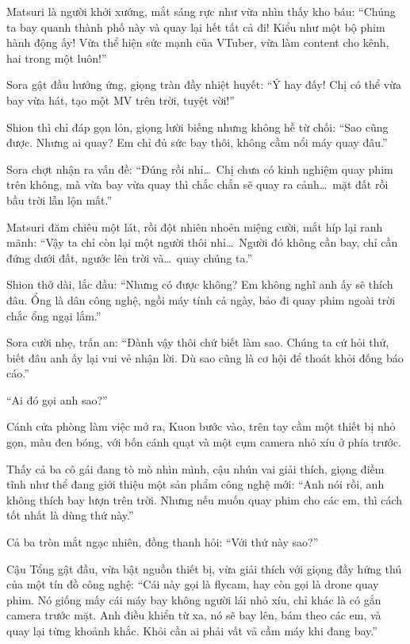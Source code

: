 \documentclass[../main.tex]{subfiles}
\begin{document}
Matsuri là người khởi xướng, mắt sáng rực như vừa nhìn thấy kho báu: ``Chúng ta bay quanh thành phố này và quay lại hết tất cả đi! Kiểu như một bộ phim hành động ấy! Vừa thể hiện sức mạnh của VTuber, vừa làm content cho kênh, hai trong một luôn!''

Sora gật đầu hưởng ứng, giọng tràn đầy nhiệt huyết: ``Ý hay đấy! Chị có thể vừa bay vừa hát, tạo một MV trên trời, tuyệt vời!''

Shion thì chỉ đáp gọn lỏn, giọng lười biếng nhưng không hề từ chối: ``Sao cũng được. Nhưng ai quay? Em chỉ đủ sức bay thôi, không cầm nổi máy quay đâu.''

Sora chợt nhận ra vấn đề: ``Đúng rồi nhỉ\dots\ Chị chưa có kinh nghiệm quay phim trên không, mà vừa bay vừa quay thì chắc chắn sẽ quay ra cảnh\dots\ mặt đất rồi bầu trời lẫn lộn mất.''

Matsuri đăm chiêu một lát, rồi đột nhiên nhoẻn miệng cười, mắt híp lại ranh mãnh: ``Vậy ta chỉ còn lại một người thôi nhỉ\dots\ Người đó không cần bay, chỉ cần đứng dưới đất, ngước lên trời và\dots\ quay chúng ta.''

Shion thở dài, lắc đầu: ``Nhưng có được không? Em không nghĩ anh ấy sẽ thích đâu. Ổng là dân công nghệ, ngồi máy tính cả ngày, bảo đi quay phim ngoài trời chắc ổng ngại lắm.''

Sora cười nhẹ, trấn an: ``Đành vậy thôi chứ biết làm sao. Chúng ta cứ hỏi thử, biết đâu anh ấy lại vui vẻ nhận lời. Dù sao cũng là cơ hội để thoát khỏi đống báo cáo.''

``Ai đó gọi anh sao?''

Cánh cửa phòng làm việc mở ra, Kuon bước vào, trên tay cầm một thiết bị nhỏ gọn, màu đen bóng, với bốn cánh quạt và một cụm camera nhỏ xíu ở phía trước.

Thấy cả ba cô gái đang tò mò nhìn mình, cậu nhún vai giải thích, giọng điềm tĩnh như thể đang giới thiệu một sản phẩm công nghệ mới: ``Anh nói rồi, anh không thích bay lượn trên trời. Nhưng nếu muốn quay phim cho các em, thì cách tốt nhất là dùng thứ này.''

Cả ba tròn mắt ngạc nhiên, đồng thanh hỏi: ``Với thứ này sao?''

Cậu Tổng gật đầu, vừa bật nguồn thiết bị, vừa giải thích với giọng đầy hứng thú của một tín đồ công nghệ: ``Cái này gọi là flycam, hay còn gọi là drone quay phim. Nó giống mấy cái máy bay không người lái nhỏ xíu, chỉ khác là có gắn camera trước mặt. Anh điều khiển từ xa, nó sẽ bay lên, bám theo các em, và quay lại từng khoảnh khắc. Khỏi cần ai phải vất vả cầm máy khi đang bay.''
\end{document}
